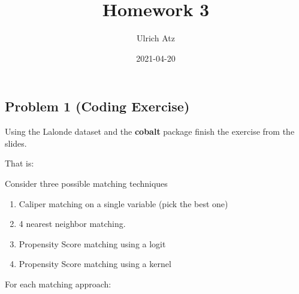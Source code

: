 \documentclass[]{tufte-handout}
\title[Econometrics II]{Homework 3}
\author{Ulrich Atz}
\date{2021-04-20}
\begin{document}
\maketitle




\hypertarget{problem-1-coding-exercise}{%
\subsection{Problem 1 (Coding
Exercise)}\label{problem-1-coding-exercise}}

Using the Lalonde dataset and the \textbf{cobalt} package finish the
exercise from the slides.

That is:

Consider three possible matching techniques

\begin{enumerate}
\item Caliper matching on a single variable (pick the best one)
\item 4 nearest neighbor matching.
\item Propensity Score matching using a logit
\item Propensity Score matching using a kernel
\end{enumerate}

For each matching approach:
\end{document}
